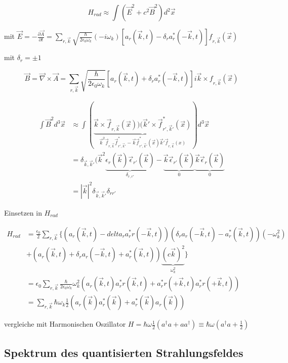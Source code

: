 \[ H_{rad} \approx \int (\vec E ^2 + c^2\vec B^2)d^2\vec x \]

mit \(\vec E = -\frac{\partial \vec A}{\partial t} = \sum_{r,\vec k}\sqrt{\frac{\hbar}{2\epsilon_0\omega_k}}(-i\omega_k)\left[a_r(\vec k,t)  - \delta_r a^*_r(-\vec k,t) \right]f_{r,\vec k}(\vec x)\)

mit \(\delta_r=\pm 1\)

\[\vec B = \vec \nabla\times\vec A = \sum_{r,\vec k}\sqrt{\frac{\hbar}{2\epsilon_0\omega_k}} \left[a_r(\vec k,t)  + \delta_r a^*_r(-\vec k,t) \right]i\vec k\times f_{r,\vec k}(\vec x)   \]


\begin{align}
\int \vec B^2 d^3\vec x &\approx \int(\underbrace{\vec k\times\vec f_{r,\vec k}(\vec x))(\vec k'\times \vec f^*_{r',\vec k'}(\vec x)}_{\vec k^2\vec f_{r,\vec k}\vec f^*_{r',\vec k'}-\vec k\vec f^*_{r',\vec k'}(\vec x)\vec k'\vec f_{r,\vec k}(x)})d^3\vec x\\
&= \delta_{\vec k,\vec k'}(\vec k^2\underbrace{\epsilon_r(\vec k)\vec \epsilon_{r'}(\vec k)  }_{\delta_{r,r'}}- \underbrace{\vec k\vec\epsilon_{r'}(\vec k)}_{0}\underbrace{\vec k\vec \epsilon_r(\vec k)}_{0}\\
&= |\vec k|^2\delta_{\vec k,\vec k'}\delta_{rr'}
\end{align}


Einsetzen in \(H_{rad}\)

\begin{align}
H_{rad} &= \frac{\epsilon_0}{2}\sum_{r,\vec k}\{ (a_r(\vec k,t) -delta_r a^*_rr(-\vec k,t))(\delta_r a_r(-\vec k,t)-a^*_r(\vec k,t))(-\omega^2_k)\\
&+(a_r(\vec k,t)+\delta_r a_r(-\vec k,t) + a^*_r(\vec k,t) )\underbrace{(c\vec k)^2}_{\omega^2_k}    \}  \\
&=\epsilon_0 \sum_{r,\vec k} \frac{\hbar}{2\epsilon_0\omega_k} \omega_k^2 (a_r(\vec k,t)a^*_rr(\vec k,t)+a^*_rr(+\vec k,t)a^*_rr(+\vec k,t))\\
&= \sum_{r,\vec k} \hbar\omega_k \frac{1}{2}(a_r(\vec k)a^*_r(\vec k) + a^*_r(\vec k)a_r(\vec k))
\end{align}

vergleiche mit Harmonischen Oszillator \(H = \hbar\omega \frac{1}{2}(a^\dagger a+ aa^\dagger)\equiv \hbar\omega(a^\dagger a+\frac{1}{2})\)



\subsection{Spektrum des quantisierten Strahlungsfeldes}

